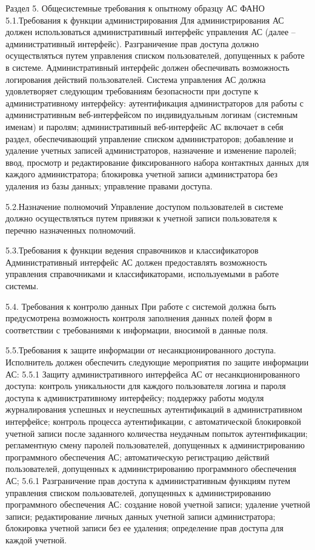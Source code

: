 Раздел 5. Общесистемные требования к опытному образцу АС ФАНО
5.1.Требования к функции администрирования  
Для администрирования АС должен использоваться административный интерфейс управления АС (далее – административный интерфейс).  
Разграничение прав доступа должно осуществляться путем управления списком пользователей, допущенных к работе в системе.
Административный интерфейс должен обеспечивать возможность логирования действий пользователей.
Система управления АС должна удовлетворяет следующим требованиям безопасности при доступе к административному интерфейсу:
аутентификация администраторов для работы с административным веб-интерфейсом по индивидуальным логинам (системным именам) и паролям;
административный веб-интерфейс АС включает в себя раздел, обеспечивающий управление списком администраторов; 
добавление и удаление учетных записей администраторов, назначение и изменение паролей;
ввод, просмотр и редактирование фиксированного набора контактных данных для каждого администратора;
блокировка учетной записи администратора без удаления из базы данных;
управление правами доступа.

5.2.Назначение полномочий
Управление доступом пользователей в системе должно осуществляться путем привязки к учетной записи пользователя к перечню назначенных полномочий. 

5.3.Требования к функции ведения справочников и классификаторов
Административный интерфейс АС должен предоставлять возможность управления справочниками и классификаторами, используемыми в работе системы.

5.4. Требования к контролю данных
При работе с системой должна быть предусмотрена возможность контроля заполнения данных полей форм в соответствии с требованиями к информации, вносимой в данные поля.

5.5.Требования к защите информации от несанкционированного доступа.
Исполнитель должен обеспечить следующие мероприятия по защите информации АС:
5.5.1 Защиту административного интерфейса АС от несанкционированного доступа:
контроль уникальности для каждого пользователя логина и пароля доступа к административному интерфейсу;
поддержку работы модуля журналирования успешных и неуспешных аутентификаций в административном интерфейсе;
контроль процесса аутентификации, с автоматической блокировкой учетной записи после заданного количества неудачным попыток аутентификации;
регламентную смену паролей пользователей, допущенных к администрированию программного обеспечения АС;
автоматическую регистрацию действий пользователей, допущенных к администрированию программного обеспечения АС;
5.6.1  Разграничение прав доступа к административным функциям путем управления списком пользователей, допущенных к администрированию программного обеспечения АС:
создание новой учетной записи;
удаление учетной записи;
редактирование личных данных учетной записи администратора;
блокировка учетной записи без ее удаления;
определение прав доступа для каждой учетной.

